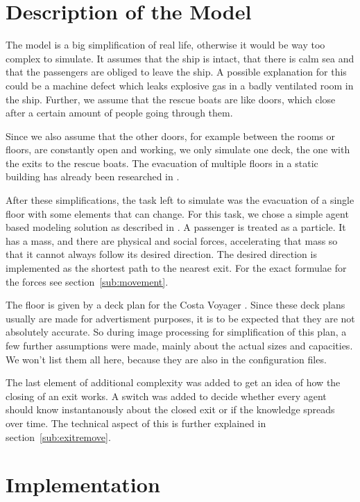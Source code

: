 \documentclass[11pt]{article}
\begin{document}
\section{Description of the Model}

The model is a big simplification of real life, otherwise it would be way too
complex to simulate.  It assumes that the ship is intact, that there is calm
sea and that the passengers are obliged to leave the ship.  A possible
explanation for this could be a machine defect which leaks explosive gas in a
badly ventilated room in the ship.  Further, we assume that the rescue boats are
like doors, which close after a certain amount of people going through them. 

Since we also assume that the other doors, for example between the rooms or
floors, are constantly open and working, we only simulate one deck, the one
with the exits to the rescue boats.  The evacuation of multiple floors in a
static building has already been researched in \cite{multilevel}. 

After these simplifications, the task left to simulate was the evacuation of a
single floor with some elements that can change.  For this task, we chose a
simple agent based modeling solution as described in \cite{helbing}.  A
passenger is treated as a particle.  It has a mass, and there are physical and
social forces, accelerating that mass so that it cannot always follow its
desired direction.  The desired direction is implemented as the shortest path
to the nearest exit.  For the exact formulae for the forces see
section~\ref{sub:movement}.

The floor is given by a deck plan for the Costa Voyager \cite{costa}. Since
these deck plans usually are made for advertisment purposes, it is to be
expected that they are not absolutely accurate.  So during image processing for
simplification of this plan, a few further assumptions were made, mainly about
the actual sizes and capacities.  We won't list them all here, because they are
also in the configuration files. 

The last element of additional complexity was added to get an idea of how the
closing of an exit works.  A switch was added to decide whether every agent
should know instantanously about the closed exit or if the knowledge spreads
over time.  The technical aspect of this is further explained in
section~\ref{sub:exitremove}.

\section{Implementation}
\end{document}
